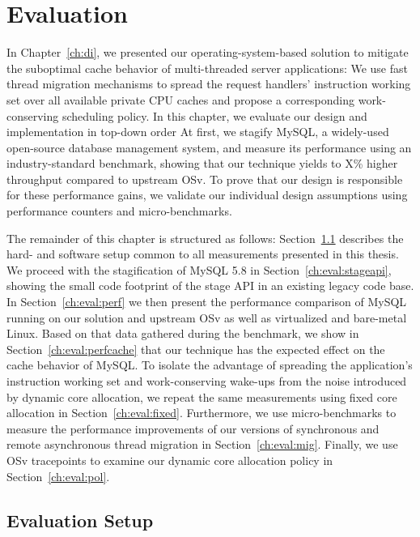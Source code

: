 \documentclass[12pt,a4paper]{book}
\begin{document}
\chapter{Evaluation}\label{ch:eval}
In Chapter~\ref{ch:di}, we presented our operating-system-based solution to mitigate the suboptimal cache behavior of multi-threaded server applications:
We use fast thread migration mechanisms to spread the request handlers' instruction working set over all available private CPU caches and propose a corresponding work-conserving scheduling policy.
In this chapter, we evaluate our design and implementation in top-down order 
At first, we stagify MySQL, a widely-used open-source database management system, and measure its performance using an industry-standard benchmark, showing that our technique yields to X\% higher throughput compared to upstream OSv. 
To prove that our design is responsible for these performance gains, we validate our individual design assumptions using performance counters and micro-benchmarks.

The remainder of this chapter is structured as follows:
Section~\ref{ch:eval:setup} describes the hard- and software setup common to all measurements presented in this thesis.
We proceed with the stagification of MySQL 5.8 in Section~\ref{ch:eval:stageapi}, showing the small code footprint of the stage API in an existing legacy code base.
In Section~\ref{ch:eval:perf} we then present the performance comparison of MySQL running on our solution and upstream OSv as well as virtualized and bare-metal Linux.
Based on that data gathered during the benchmark, we show in Section~\ref{ch:eval:perfcache} that our technique has the expected effect on the cache behavior of MySQL.
To isolate the advantage of spreading the application's instruction working set and work-conserving wake-ups from the noise introduced by dynamic core allocation,
we repeat the same measurements using fixed core allocation in Section~\ref{ch:eval:fixed}.
Furthermore, we use micro-benchmarks to measure the performance improvements of our versions of synchronous and remote asynchronous thread migration in Section~\ref{ch:eval:mig}.
Finally, we use OSv tracepoints to examine our dynamic core allocation policy in Section~\ref{ch:eval:pol}.

\section{Evaluation Setup}\label{ch:eval:setup}
% 
\end{document}
